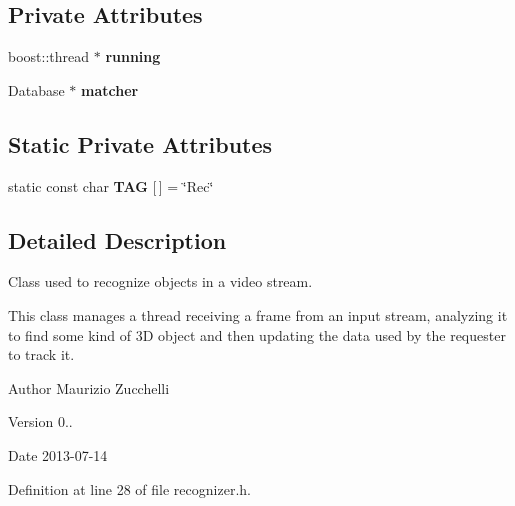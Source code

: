 \subsection*{Private Attributes}
\begin{DoxyCompactItemize}
\item 
\hypertarget{class_i_stuff_1_1_recognizer_afe1d2237a38e76da2d7615fd6750c7c4}{boost\-::thread $\ast$ {\bfseries running}}\label{class_i_stuff_1_1_recognizer_afe1d2237a38e76da2d7615fd6750c7c4}

\item 
\hypertarget{class_i_stuff_1_1_recognizer_afaba7db86af7bbf83f12472b7fc11e93}{Database $\ast$ {\bfseries matcher}}\label{class_i_stuff_1_1_recognizer_afaba7db86af7bbf83f12472b7fc11e93}

\end{DoxyCompactItemize}
\subsection*{Static Private Attributes}
\begin{DoxyCompactItemize}
\item 
\hypertarget{class_i_stuff_1_1_recognizer_a90ec5deceaef320be5e825f653dcf7f1}{static const char {\bfseries T\-A\-G} \mbox{[}$\,$\mbox{]} = \char`\"{}Rec\char`\"{}}\label{class_i_stuff_1_1_recognizer_a90ec5deceaef320be5e825f653dcf7f1}

\end{DoxyCompactItemize}


\subsection{Detailed Description}
Class used to recognize objects in a video stream. 

This class manages a thread receiving a frame from an input stream, analyzing it to find some kind of 3\-D object and then updating the data used by the requester to track it. \begin{DoxyAuthor}{Author}
Maurizio Zucchelli 
\end{DoxyAuthor}
\begin{DoxyVersion}{Version}
0.. 
\end{DoxyVersion}
\begin{DoxyDate}{Date}
2013-\/07-\/14 
\end{DoxyDate}


Definition at line 28 of file recognizer.\-h.



